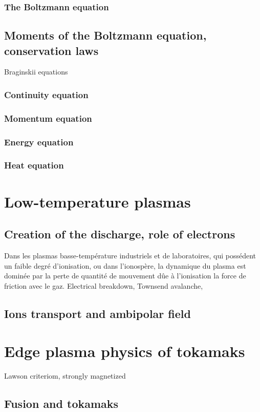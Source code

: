 			\subsubsection{The Boltzmann equation}
		\subsection{Moments of the Boltzmann equation, conservation laws}
			Braginskii equations
			\subsubsection{Continuity equation}
			\subsubsection{Momentum equation}
			\subsubsection{Energy equation}
			\subsubsection{Heat equation}
	\section{Low-temperature plasmas}
		\subsection{Creation of the discharge, role of electrons}
		Dans les plasmas basse-température industriels et de laboratoires, qui possédent
			un faible degré d'ionisation, ou dans l'ionospère, la dynamique du plasma est dominée par
			la perte de quantité de mouvement dûe à l'ionisation la force de friction avec le gaz.
		Electrical breakdown, Townsend avalanche, 
		\subsection{Ions transport and ambipolar field}
	\section{Edge plasma physics of tokamaks}
		Lawson criteriom, strongly magnetized
		\subsection{Fusion and tokamaks}
